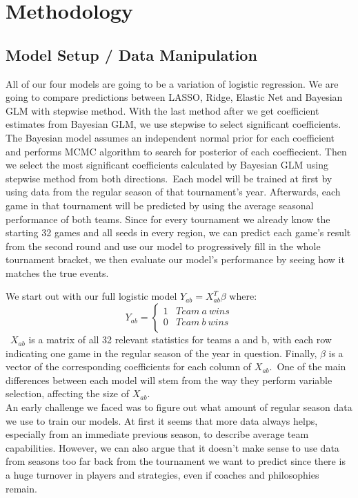 \documentclass{article} %
\begin{document}
\section{Methodology}
\label{gen_inst}

\subsection{Model Setup / Data Manipulation}
All of our four models are going to be a variation of logistic regression. We are going to compare predictions between LASSO, Ridge, Elastic Net and Bayesian GLM with stepwise method. With the last method after we get coefficient estimates from Bayesian GLM, we use stepwise to select significant coefficients. The Bayesian model assumes an independent normal prior for each coefficient and performs MCMC algorithm to search for posterior of each coeffiecient. Then we select the most significant coefficients calculated by Bayesian GLM using stepwise method from both directions.\
Each model will be trained at first by using data from the regular season of that tournament's year. Afterwards, each game in that tournament will be predicted by using the average seasonal performance of both teams. Since for every tournament we already know the starting 32 games and all seeds in every region, we can predict each game's result from the second round and use our model to progressively fill in the whole tournament bracket, we then evaluate our model's performance by seeing how it matches the true events.

We start out with our full logistic model $Y_{ab} = X_{ab}^T \beta$ where:\
\[ Y_{ab} = \left\{
\begin{array}{ll}
1 & Team \ a \ wins \\
0 &  Team \ b \ wins \\
\end{array} 
\right. \]\
$X_{ab}$ is a matrix of all 32 relevant statistics for teams a and b, with each row indicating one game in the regular season of the year in question. Finally, $\beta$ is a vector of the corresponding coefficients for each column of $X_{ab}$.\ One of the main differences between each model will stem from the way they perform variable selection, affecting the size of $X_{ab}$.\\

An early challenge we faced was to figure out what amount of regular season data we use to train our models. At first it seems that more data always helps, especially from an immediate previous season, to describe average team capabilities.  However, we can also argue that it doesn't make sense to use data from seasons too far back from the tournament we want to predict since there is a huge turnover in players and strategies, even if coaches and philosophies remain.
\end{document}
